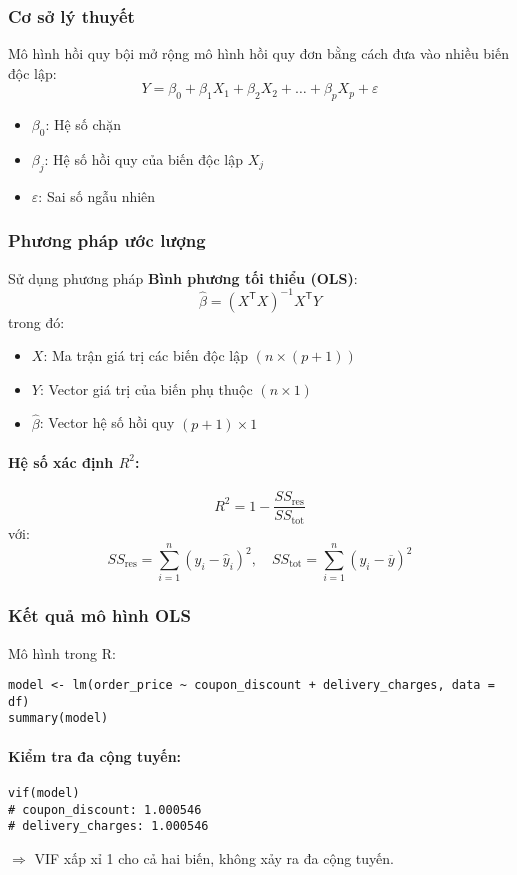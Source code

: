 \subsubsection{Cơ sở lý thuyết}
Mô hình hồi quy bội mở rộng mô hình hồi quy đơn bằng cách đưa vào nhiều biến độc lập:
\[
Y = \beta_0 + \beta_1 X_1 + \beta_2 X_2 + \dots + \beta_p X_p + \varepsilon
\]
\begin{itemize}
    \item $\beta_0$: Hệ số chặn
    \item $\beta_j$: Hệ số hồi quy của biến độc lập $X_j$
    \item $\varepsilon$: Sai số ngẫu nhiên
\end{itemize}

\subsubsection{Phương pháp ước lượng}
Sử dụng phương pháp \textbf{Bình phương tối thiểu (OLS)}:
\[
\hat{\beta} = (X^\mathsf{T}X)^{-1} X^\mathsf{T} Y
\]
trong đó:
\begin{itemize}
    \item $X$: Ma trận giá trị các biến độc lập $(n \times (p+1))$
    \item $Y$: Vector giá trị của biến phụ thuộc $(n \times 1)$
    \item $\hat{\beta}$: Vector hệ số hồi quy $(p+1) \times 1$
\end{itemize}

\paragraph{Hệ số xác định $R^2$:}
\[
R^2 = 1 - \frac{SS_\text{res}}{SS_\text{tot}}
\]
với:
\[
SS_\text{res} = \sum_{i=1}^n (y_i - \hat{y}_i)^2, \quad SS_\text{tot} = \sum_{i=1}^n (y_i - \overline{y})^2
\]

\subsubsection{Kết quả mô hình OLS}
Mô hình trong R:
\begin{verbatim}
model <- lm(order_price ~ coupon_discount + delivery_charges, data = df)
summary(model)
\end{verbatim}

\paragraph{Kiểm tra đa cộng tuyến:}
\begin{verbatim}
vif(model)
# coupon_discount: 1.000546
# delivery_charges: 1.000546
\end{verbatim}
$\Rightarrow$ VIF xấp xỉ 1 cho cả hai biến, không xảy ra đa cộng tuyến.

